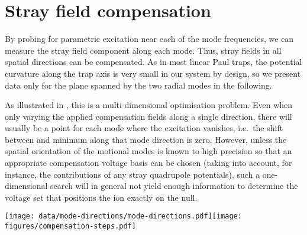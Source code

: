 \documentclass[pra,twocolumn]{revtex4-2}
\begin{document}
\section{Stray field compensation}
\label{sec:compensation}

By probing for parametric excitation near each of the mode frequencies, we can measure the stray field component along each mode.
Thus, stray fields in all spatial directions can be compensated.
As in most linear Paul traps, the \RF{} potential curvature along the trap axis is very small in our system by design, so we present data only for the plane spanned by the two radial modes in the following.

As illustrated in , this is a multi-dimensional optimisation problem.
Even when only varying the applied compensation fields along a single direction, there will usually be a point for each mode where the excitation vanishes, i.e.~the shift between \DC{} and \RF{} minimum along that mode direction is zero.
However, unless the spatial orientation of the motional modes is known to high precision so that an appropriate compensation voltage basis can be chosen (taking into account, for instance, the contributions of any stray quadrupole potentials), such a one-dimensional search will in general not yield enough information to determine the voltage set that positions the ion exactly on the \RF{} null.

\begin{figure*}
	\texttt{[image: data/mode-directions/mode-directions.pdf]}\hfill\texttt{[image: figures/compensation-steps.pdf]}
	\caption{
		Stray field compensation in two dimensions.
		\textbf{(a), (b): }Complex fractional amplitude of photon arrival times correlated with the fixed excitation frequency of \SI{2.339}{\mega\hertz} and \SI{2.900}{\mega\hertz}, respectively, for a detuning of \SI{22}{\kilo\hertz} relative to each radial mode in the scan centre.
		Along the dashed lines, the residual displacement of in the direction of the given mode is minimised; all radial micromotion is compensated in the centre of the plot, where both lines would intersect.
		The dotted vertical lines mark the values for $E_{\mathrm{IP}}$ used in the three scans shown in  for visual comparison.
		Both mode frequencies increase towards negative out-of-plane fields, reducing the detuning, giving rise to the stronger signals in the lower part of the plots.
		\textbf{(c): }To simultaneously compensate stray fields in both directions, a fixed-point iteration scheme can be employed, where the excitation on either mode is minimised in an alternating fashion by applying compensation fields in some pre-defined basis (here in the IP and OOP directions).
		This simple strategy is successful as long as the mode orientation is known to better than \SI{45}{\degree} (top), but an adaptive algorithm, which at each point estimates the local mode directions from previous measurements to avoid moving the ion off the respective other null, can greatly speed up convergence (bottom).
	}
	\label{fig:mode-directions}
\end{figure*}
\end{document}

